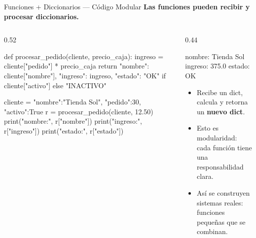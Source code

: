 \documentclass[aspectratio=169, 11pt]{beamer}
\begin{document}
\begin{frame}[fragile,shrink=31]{Funciones + Diccionarios --- Código Modular}
  \vspace{-6pt}
  {\footnotesize\color{arcaDark}\bfseries
    Las funciones pueden recibir y procesar diccionarios.}

  \vspace{2pt}
  \begin{columns}[T]
    \begin{column}{0.52\textwidth}
      \begin{pyblock}
def procesar_pedido(cliente, precio_caja):
    ingreso = cliente["pedido"] * precio_caja
    return {
        "nombre": cliente["nombre"],
        "ingreso": ingreso,
        "estado": "OK" if cliente["activo"] else "INACTIVO"
    }

cliente = {"nombre":"Tienda Sol", "pedido":30, "activo":True}
r = procesar_pedido(cliente, 12.50)
print("nombre:", r["nombre"])
print("ingreso:", r["ingreso"])
print("estado:", r["estado"])
      \end{pyblock}
    \end{column}

    \begin{column}{0.44\textwidth}
      \vspace{2pt}
      \begin{outputblock}
  nombre: Tienda Sol
  ingreso: 375.0
  estado: OK
      \end{outputblock}

      \vspace{2pt}
      {\scriptsize\color{textMuted}
      \begin{itemize}\setlength{\itemsep}{3pt}
        \item[{\color{arcaRed}\scriptsize\faArrowRight}]
          Recibe un dict, calcula y retorna
          un \textbf{nuevo dict}.
        \item[{\color{arcaRed}\scriptsize\faArrowRight}]
          Esto es modularidad: cada función
          tiene una responsabilidad clara.
        \item[{\color{arcaRed}\scriptsize\faLightbulb}]
          Así se construyen sistemas reales:
          funciones pequeñas que se combinan.
      \end{itemize}
      }
    \end{column}
  \end{columns}
\end{frame}
\end{document}
